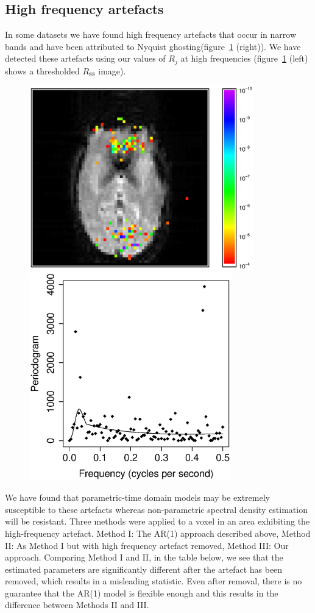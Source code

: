 \documentclass[a0,portrait]{a0poster}
\begin{document}
\begin{multicols}{3}
\section{High frequency artefacts}
In some datasets we have found high frequency artefacts that occur in narrow bands and have been attributed to Nyquist ghosting(figure~\ref{ghost} (right)). We have detected these artefacts using our values of $R_j$ at high frequencies (figure~\ref{ghost} (left) shows a thresholded $R_{88}$ image).
\begin{figure}
\includegraphics[height=80mm,bb=100 265 500 590]{jm.fig19.eps}
\includegraphics[height=90mm,bb=90 210 470 600]{jm.fig17.eps}
\caption{}
\label{ghost}
\end{figure}
We have found that parametric-time domain models may be extremely susceptible to these artefacts whereas non-parametric spectral density estimation will be resistant. Three methods were applied to a voxel in an area exhibiting the high-frequency artefact. Method I: The AR(1) approach described above, Method II: As Method I but with high frequency artefact removed, Method III: Our approach. Comparing Method I and II, in the table below, we see that the estimated parameters are significantly different after the artefact has been removed, which results in a misleading statistic. Even after removal, there is no guarantee that the AR(1) model is flexible enough and this results in the difference between Methods II and III.

\end{multicols}
\end{document}
